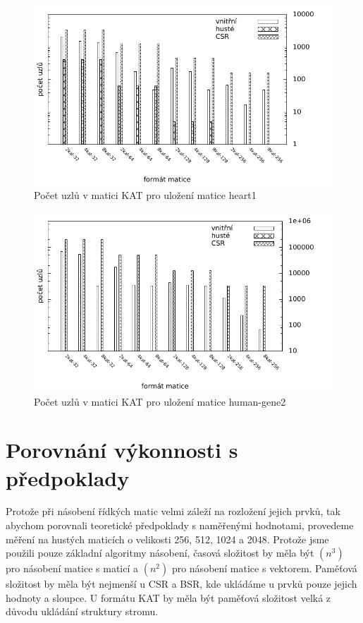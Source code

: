 \begin{figure}[htb]
	\includegraphics[width=1.0\textwidth]{./images/measure1/kat_nodes_heart1}
	\caption{Počet uzlů v matici KAT pro uložení matice heart1}
	\label{fig:mtxsizeheart}
\end{figure}

\begin{figure}[htb]
	\includegraphics[width=1.0\textwidth]{./images/measure1/kat_nodes_human-gene2}
	\caption{Počet uzlů v matici KAT pro uložení matice human-gene2}
	\label{fig:mtxsizehuman}
\end{figure}



\section{Porovnání výkonnosti s předpoklady}

Protože při násobení řídkých matic velmi záleží na rozložení jejich prvků, tak abychom porovnali teoretické předpoklady s naměřenými hodnotami, provedeme měření na hustých maticích o velikosti 256, 512, 1024 a 2048. Protože jsme použili pouze základní algoritmy  násobení, časová složitost by měla být \bigO$(n^3)$ pro násobení matice s maticí a \bigO$(n^2)$ pro násobení matice s vektorem. Paměťová složitost by měla být nejmenší u CSR a BSR, kde ukládáme u prvků pouze jejich hodnoty a sloupce. U formátu KAT by měla být paměťová složitost velká z důvodu ukládání struktury stromu.

